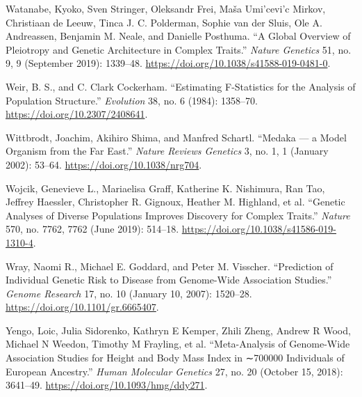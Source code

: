 \documentclass[
]{book}
\newlength{\cslhangindent}
\newlength{\cslentryspacingunit} %
\newenvironment{CSLReferences}[2] %
 {%
  \setlength{\parindent}{0pt}
  \ifodd #1
  \let\oldpar\par
  \def\par{\hangindent=\cslhangindent\oldpar}
  \fi
  \setlength{\parskip}{#2\cslentryspacingunit}
 }%
 {}
\begin{document}
\begin{CSLReferences}{1}{0}
\leavevmode{}%
Watanabe, Kyoko, Sven Stringer, Oleksandr Frei, Maša Umi'cevi'c Mirkov, Christiaan de Leeuw, Tinca J. C. Polderman, Sophie van der Sluis, Ole A. Andreassen, Benjamin M. Neale, and Danielle Posthuma. {``A Global Overview of Pleiotropy and Genetic Architecture in Complex Traits.''} \emph{Nature Genetics} 51, no. 9, 9 (September 2019): 1339--48. \url{https://doi.org/10.1038/s41588-019-0481-0}.

\leavevmode{}%
Weir, B. S., and C. Clark Cockerham. {``Estimating {F-Statistics} for the {Analysis} of {Population Structure}.''} \emph{Evolution} 38, no. 6 (1984): 1358--70. \url{https://doi.org/10.2307/2408641}.

\leavevmode{}%
Wittbrodt, Joachim, Akihiro Shima, and Manfred Schartl. {``Medaka --- a Model Organism from the Far East.''} \emph{Nature Reviews Genetics} 3, no. 1, 1 (January 2002): 53--64. \url{https://doi.org/10.1038/nrg704}.

\leavevmode{}%
Wojcik, Genevieve L., Mariaelisa Graff, Katherine K. Nishimura, Ran Tao, Jeffrey Haessler, Christopher R. Gignoux, Heather M. Highland, et al. {``Genetic Analyses of Diverse Populations Improves Discovery for Complex Traits.''} \emph{Nature} 570, no. 7762, 7762 (June 2019): 514--18. \url{https://doi.org/10.1038/s41586-019-1310-4}.

\leavevmode{}%
Wray, Naomi R., Michael E. Goddard, and Peter M. Visscher. {``Prediction of Individual Genetic Risk to Disease from Genome-Wide Association Studies.''} \emph{Genome Research} 17, no. 10 (January 10, 2007): 1520--28. \url{https://doi.org/10.1101/gr.6665407}.

\leavevmode{}%
Yengo, Loic, Julia Sidorenko, Kathryn E Kemper, Zhili Zheng, Andrew R Wood, Michael N Weedon, Timothy M Frayling, et al. {``Meta-Analysis of Genome-Wide Association Studies for Height and Body Mass Index in ∼700000 Individuals of {European} Ancestry.''} \emph{Human Molecular Genetics} 27, no. 20 (October 15, 2018): 3641--49. \url{https://doi.org/10.1093/hmg/ddy271}.

\end{CSLReferences}
\end{document}
